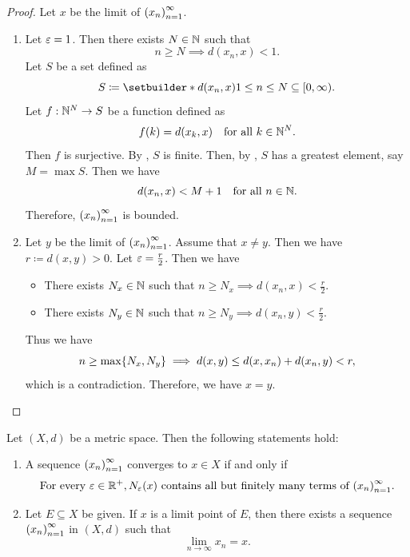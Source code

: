 \begin{proof}
    Let $x$ be the limit of $\paren*{x_{n}}_{n = 1}^{\infty}$.
    \begin{enumerate}[label=\textbf{(\Alph*)}]
        \item Let $\veps = 1$. Then there exists $N \in \N$ such that
        \[
        n \geq N \implies d(x_{n}, x) < 1.
        \]
        Let $S$ be a set defined as
        \[
        S \coloneqq \setbuilder*{d(x_{n}, x)}{1 \leq n \leq N} \subseteq [0, \infty).
        \]
        Let $f: \N^{N} \to S$ be a function defined as
        \[
        f(k) = d(x_{k}, x) \quad \text{for all } k \in \N^{N}.
        \]
        Then $f$ is surjective. By , $S$ is finite. Then, by
        , $S$ has a greatest element, say $M = \max S$. Then we have
        \[
        d(x_{n}, x) < M + 1 \quad \text{for all } n \in \N.
        \]
        Therefore, $\paren*{x_{n}}_{n = 1}^{\infty}$ is bounded.
        \item Let $y$ be the limit of $\paren*{x_{n}}_{n = 1}^{\infty}$. Assume that $x \neq y$.
        Then we have $r \coloneqq d(x, y) > 0$. Let $\veps = \frac{r}{2}$. Then we have
        \begin{itemize}
            \item There exists $N_{x} \in \N$ such that $n \geq N_{x} \implies d(x_{n}, x) < \frac{r}{2}$.
            \item There exists $N_{y} \in \N$ such that $n \geq N_{y} \implies d(x_{n}, y) < \frac{r}{2}$.
        \end{itemize}
        Thus we have
        \[
        n \geq \max\set*{N_{x}, N_{y}} \implies d(x, y) \leq d(x, x_{n}) + d(x_{n}, y) < r,
        \]
        which is a contradiction. Therefore, we have $x = y$.
    \end{enumerate}
\end{proof}

\bigskip

\begin{theorem} \label{an:thm:neighborhood}
    Let $(X, d)$ be a metric space. Then the following statements hold:
    \begin{enumerate}[label=\textbf{(\Alph*)}]
        \item A sequence $\paren*{x_{n}}_{n = 1}^{\infty}$ converges to $x \in X$ if and only if
        \[
        \text{For every } \veps \in \R^{+}, N_{\veps}(x) \text{ contains all but
        finitely many terms of } \paren*{x_{n}}_{n = 1}^{\infty}.
        \]
        \item Let $E \subseteq X$ be given. If $x$ is a limit point of $E$, then there exists
        a sequence $\paren*{x_{n}}_{n = 1}^{\infty}$ in $(X, d)$ such that
        \[
        \lim_{n \to \infty} x_{n} = x.
        \]
    \end{enumerate}
\end{theorem}

